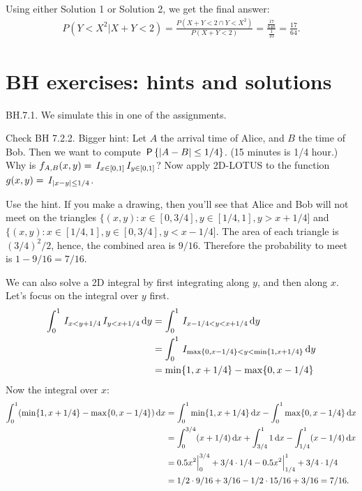 \begin{exercise}
\begin{solution}
            Using either Solution 1 or Solution 2, we get the final answer:
            \begin{align*}
                P(Y<X^2|X+Y<2) = \frac{P(X+Y<2\cap Y < X^2)}{P(X+Y<2)} = \frac{\frac{17}{640}}{\frac{1}{10}} = \frac{17}{64}.
            \end{align*}
\end{solution}
\end{exercise}




\section{BH exercises: hints and solutions}
\label{sec:hints-solut-exerc}



\begin{exercise}
BH.7.1. We simulate this in one of the assignments.
\begin{hint}
Check BH 7.2.2. Bigger hint: Let $A$ the arrival time of Alice, and $B$ the time of Bob. Then we want to compute $\P{|A-B|\leq 1/4}$.  (15 minutes is 1/4 hour.)  Why is $f_{A,B}(x,y) = \1{x\in[0,1]}\1{y\in [0,1]}$? Now apply 2D-LOTUS to the function $g(x,y) = \1{|x-y|\leq 1/4}$.
\end{hint}
\begin{solution}
Use the hint. If you make a drawing, then you'll see that Alice and Bob will not meet on the triangles
$\{(x,y) : x\in [0, 3/4], y\in [1/4, 1], y>x+1/4]$ and $\{(x,y) : x\in [1/4, 1], y\in [0, 3/4], y<x-1/4]$. The area of each triangle is $(3/4)^{2}/2$, hence, the combined area is $9/16$. Therefore the probability to meet is $1-9/16=7/16$.

We can also solve   a 2D integral by first integrating along $y$, and then along $x$. Let's focus on the integral over $y$ first.
\begin{align*}
\int_0^1 \1{x<y+1/4}\1{y<x+1/4} \d y
&=\int_0^1 \1{x-1/4<y<x+1/4} \d y \\
&=\int_0^1 \1{\max\{0, x-1/4\} <y < \min\{1,x+1/4\}} \d y \\
&= \min\{1,x+1/4\} - \max\{0, x-1/4\}
\end{align*}
Now the integral over $x$:
\begin{align*}
  \int_0^1 (\min\{1,x+1/4\} - \max\{0, x-1/4\}) \d x
&=  \int_0^1 \min\{1,x+1/4\}\d x - \int_0^{1}\max\{0, x-1/4\} \d x  \\
&=  \int_0^{3/4}(x+1/4)\d x + \int_{3/4}^{1}1 \d x
 - \int_{1/4}^{1}(x-1/4) \d x \\
  &=0.5 x^2\Big|_{0}^{3/4} + 3/4\cdot 1/4 - 0.5x^2\Big|_{1/4}^1 + 3/4\cdot 1/4 \\
  &= 1/2\cdot 9/16 + 3/16 - 1/2\cdot 15/16 + 3/16 = 7/16.
\end{align*}

\end{solution}
\end{exercise}


